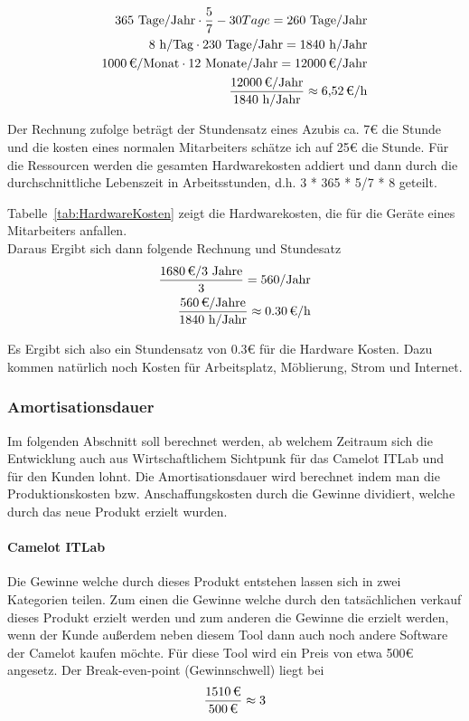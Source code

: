 \begin{eqnarray}
	365 \mbox{ Tage/Jahr} \cdot \frac{5}{7} - 30 Tage = 260 \mbox{ Tage/Jahr}\\
	8 \mbox{ h/Tag} \cdot 230 \mbox{ Tage/Jahr} = 1840 \mbox{ h/Jahr}\\
	\eur{1000}\mbox{/Monat} \cdot 12 \mbox{ Monate/Jahr} = \eur{12000} \mbox{/Jahr}\\
	\frac{\eur{12000} \mbox{/Jahr}}{1840 \mbox{ h/Jahr}} \approx \eur{6,52}\mbox{/h}
\end{eqnarray}
	
Der Rechnung zufolge beträgt der Stundensatz eines Azubis ca. 7€ die Stunde und die kosten eines normalen Mitarbeiters schätze ich auf 25€ die Stunde. Für die Ressourcen werden die gesamten Hardwarekosten addiert und dann durch die durchschnittliche Lebenszeit in Arbeitsstunden, d.h. 3 * 365 * 5/7 * 8 geteilt.
	
Tabelle~\ref{tab:HardwareKosten} zeigt die Hardwarekosten, die für die Geräte eines Mitarbeiters anfallen.
\\
	
Daraus Ergibt sich dann folgende Rechnung und Stundesatz
\begin{eqnarray}
	\frac{\eur{1680} \mbox{/3 Jahre}}{3} = 560 \mbox{/Jahr}\\
	\frac{\eur{560} \mbox{/Jahre}}{1840 \mbox{ h/Jahr}} \approx \eur{0.30}\mbox{/h}
\end{eqnarray}

Es Ergibt sich also ein Stundensatz von 0.3€ für die Hardware Kosten. Dazu kommen natürlich noch Kosten für Arbeitsplatz, Möblierung, Strom und Internet.

\subsubsection{Amortisationsdauer}
\label{sec:Amortisationsdauer}
Im folgenden Abschnitt soll berechnet werden, ab welchem Zeitraum sich die Entwicklung auch aus Wirtschaftlichem Sichtpunk für das Camelot ITLab und für den Kunden lohnt. Die Amortisationsdauer wird berechnet indem man die Produktionskosten bzw. Anschaffungskosten durch die Gewinne dividiert, welche durch das neue Produkt erzielt wurden.

\paragraph{Camelot ITLab}
Die Gewinne welche durch dieses Produkt entstehen lassen sich in zwei Kategorien teilen. Zum einen die Gewinne welche durch den tatsächlichen verkauf dieses Produkt erzielt werden und zum anderen die Gewinne die erzielt werden, wenn der Kunde außerdem neben diesem Tool dann auch noch andere Software der Camelot kaufen möchte. Für diese Tool wird ein Preis von etwa 500€ angesetz. Der Break-even-point (Gewinnschwell) liegt bei
\begin{eqnarray}
\frac{\eur{1510}}{\eur{500}} \approx 3 
\end{eqnarray}

